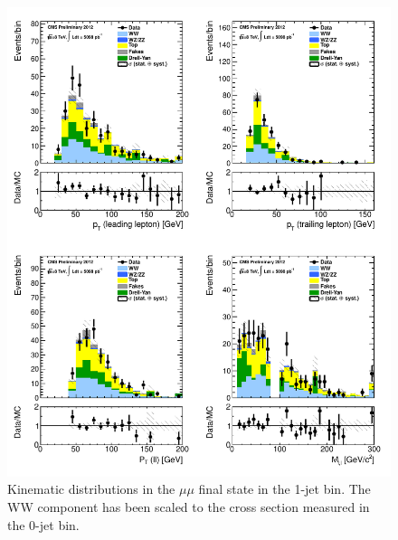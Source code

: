 \begin{figure}[!hbtp]
\centering
\includegraphics[width=1\textwidth]{figures/ww_analysis20_0_ALL_mm_1j.pdf} %
\caption{Kinematic distributions in the $\mu\mu$ final state in the 1-jet bin.
The WW component has been scaled to the cross section measured in the 0-jet bin.}
\label{fig:xs_kinematics_mm_1j}
\end{figure}
